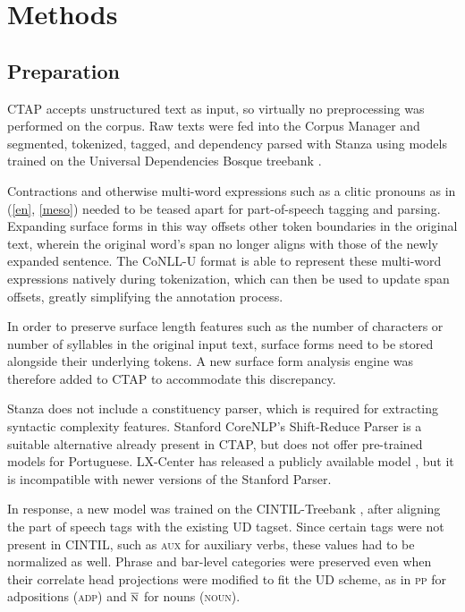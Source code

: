 \section{Methods}

\subsection{Preparation}

CTAP accepts unstructured text as input, so virtually no preprocessing was performed on the corpus. Raw texts were fed into the Corpus Manager and segmented, tokenized, tagged, and dependency parsed with Stanza using models trained on the Universal Dependencies Bosque treebank \citep{rademaker2017-bosque}.

Contractions and otherwise multi-word expressions such as a clitic pronouns as in (\ref{en}, \ref{meso}) needed to be teased apart for part-of-speech tagging and parsing. Expanding surface forms in this way offsets other token boundaries in the original text, wherein the original word's span no longer aligns with those of the newly expanded sentence. The CoNLL-U format is able to represent these multi-word expressions natively during tokenization, which can then be used to update span offsets, greatly simplifying the annotation process. 

In order to preserve surface length features such as the number of characters or number of syllables in the original input text, surface forms need to be stored alongside their underlying tokens. A new surface form analysis engine was therefore added to CTAP to accommodate this discrepancy.

Stanza does not include a constituency parser, which is required for extracting syntactic complexity features. Stanford CoreNLP's Shift-Reduce Parser is a suitable alternative already present in CTAP, but does not offer pre-trained models for Portuguese. LX-Center has released a publicly available model \citep{silva2010}, but it is incompatible with newer versions of the Stanford Parser.

In response, a new model was trained on the CINTIL-Treebank \citep{branco2014-cintil}, after aligning the part of speech tags with the existing UD tagset. Since certain tags were not present in CINTIL, such as {\scshape aux} for auxiliary verbs, these values had to be normalized as well. Phrase and bar-level categories were preserved even when their correlate head projections were modified to fit the UD scheme, as in {\scshape pp} for adpositions ({\scshape adp}) and $\overline{\mbox{{\scshape n}}}$ for nouns ({\scshape noun}).

